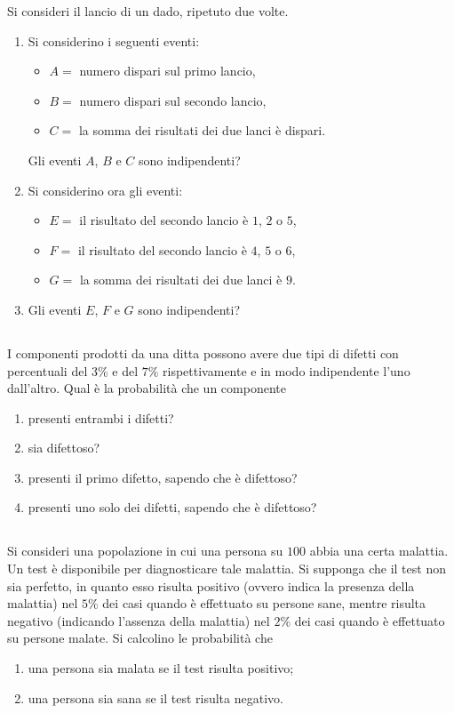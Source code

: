 Si consideri il lancio di un dado, ripetuto due volte.
\begin{enumerate}
\item Si considerino i seguenti eventi:
\begin{itemize}
\item $A=$ numero dispari sul primo lancio,
\item $B=$ numero dispari sul secondo lancio,
\item $C=$ la somma dei risultati dei due lanci è dispari.
\end{itemize}

Gli eventi $A$, $B$ e $C$ sono indipendenti?
\item Si considerino ora gli eventi:
\begin{itemize}
\item $E=$ il risultato del secondo lancio è $1$, $2$ o $5$,
\item $F=$ il risultato del secondo lancio è $4$, $5$ o $6$,
\item $G=$ la somma dei risultati dei due lanci è $9$.
\end{itemize}
\item Gli eventi $E$, $F$ e $G$ sono indipendenti?
\end{enumerate}
\subsection{}

I componenti prodotti da una ditta possono avere due tipi di difetti con percentuali del $3\%$ e del $7\%$ rispettivamente e in modo indipendente l'uno dall'altro. Qual è la probabilità che un componente
\begin{enumerate}
\item presenti entrambi i difetti?
\item sia difettoso?
\item presenti il primo difetto, sapendo che è difettoso?
\item presenti uno solo dei difetti, sapendo che è difettoso?
\end{enumerate}
\subsection{}

Si consideri una popolazione in cui una persona su $100$ abbia una certa malattia. Un test è disponibile per diagnosticare tale malattia. Si supponga che il test non sia perfetto, in quanto esso risulta positivo (ovvero indica la presenza della malattia) nel $5\%$ dei casi quando è effettuato su persone sane, mentre risulta negativo (indicando l'assenza della malattia) nel $2\%$ dei casi quando è effettuato su persone malate. Si calcolino le probabilità che
\begin{enumerate}
\item una persona sia malata se il test risulta positivo;
\item una persona sia sana se il test risulta negativo.
\end{enumerate}
